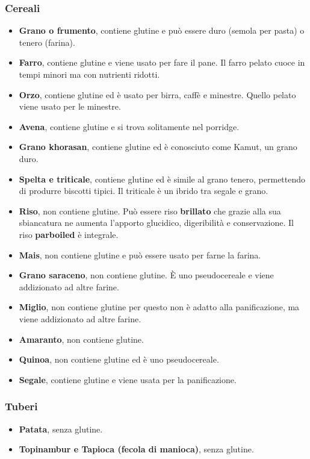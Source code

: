 \documentclass[10pt]{article}
\begin{document}
\subsubsection{Cereali}
\begin{itemize}
\item\textbf{Grano o frumento}, contiene glutine e può essere duro (semola per pasta) o tenero (farina).
\item\textbf{Farro}, contiene glutine e viene usato per fare il pane. Il farro pelato cuoce in tempi minori ma con nutrienti ridotti.
\item\textbf{Orzo}, contiene glutine ed è usato per birra, caffè e minestre. Quello pelato viene usato per le minestre.
\item\textbf{Avena}, contiene glutine e si trova solitamente nel porridge.
\item\textbf{Grano khorasan}, contiene glutine ed è conosciuto come Kamut, un grano duro.
\item\textbf{Spelta e triticale}, contiene glutine ed è simile al grano tenero, permettendo di produrre biscotti tipici. Il triticale è un ibrido tra segale e grano.
\item\textbf{Riso}, non contiene glutine. Può essere riso \textbf{brillato} che grazie alla sua sbiancatura ne aumenta l'apporto glucidico, digeribilità e conservazione. Il riso \textbf{parboiled} è integrale.
\item\textbf{Mais}, non contiene glutine e può essere usato per farne la farina. 
\item\textbf{Grano saraceno}, non contiene glutine. È uno pseudocereale e viene addizionato ad altre farine.
\item\textbf{Miglio}, non contiene glutine per questo non è adatto alla panificazione, ma viene addizionato ad altre farine.
\item\textbf{Amaranto}, non contiene glutine.
\item\textbf{Quinoa}, non contiene glutine ed è uno pseudocereale.
\item\textbf{Segale}, contiene glutine e viene usata per la panificazione.
\end{itemize}
\subsubsection{Tuberi}
\begin{itemize}
\item\textbf{Patata}, senza glutine. 
\item\textbf{Topinambur e Tapioca (fecola di manioca)}, senza glutine.
\end{itemize}
\end{document}
